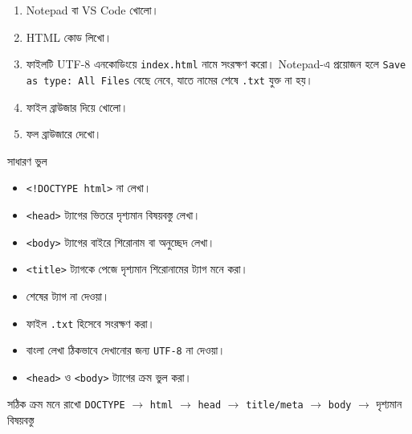 \begin{enumerate}
\item Notepad বা VS Code খোলো।
\item HTML কোড লিখো।
\item ফাইলটি UTF-8 এনকোডিংয়ে \texttt{index.html} নামে সংরক্ষণ করো। Notepad-এ প্রয়োজন হলে \texttt{Save as type: All Files} বেছে নেবে, যাতে নামের শেষে \texttt{.txt} যুক্ত না হয়।
\item ফাইল ব্রাউজার দিয়ে খোলো।
\item ফল ব্রাউজারে দেখো।
\end{enumerate}

\begin{mistakebox}{সাধারণ ভুল}
\par\noindent
\begin{minipage}[t]{.48\linewidth}\vspace{0pt}
\begin{itemize}
\item \texttt{<!DOCTYPE html>} না লেখা।
\item \texttt{<head>} ট্যাগের ভিতরে দৃশ্যমান বিষয়বস্তু লেখা।
\item \texttt{<body>} ট্যাগের বাইরে শিরোনাম বা অনুচ্ছেদ লেখা।
\item \texttt{<title>} ট্যাগকে পেজে দৃশ্যমান শিরোনামের ট্যাগ মনে করা।
\end{itemize}
\end{minipage}\hfill
\begin{minipage}[t]{.48\linewidth}\vspace{0pt}
\begin{itemize}
\item শেষের ট্যাগ না দেওয়া।
\item ফাইল \texttt{.txt} হিসেবে সংরক্ষণ করা।
\item বাংলা লেখা ঠিকভাবে দেখানোর জন্য \texttt{UTF-8} না দেওয়া।
\item \texttt{<head>} ও \texttt{<body>} ট্যাগের ক্রম ভুল করা।
\end{itemize}
\end{minipage}\par

\end{mistakebox}

\begin{boardbox}{সঠিক ক্রম মনে রাখো}
\texttt{DOCTYPE} $\rightarrow$ \texttt{html} $\rightarrow$ \texttt{head} $\rightarrow$ \texttt{title/meta} $\rightarrow$ \texttt{body} $\rightarrow$ দৃশ্যমান বিষয়বস্তু
\end{boardbox}

